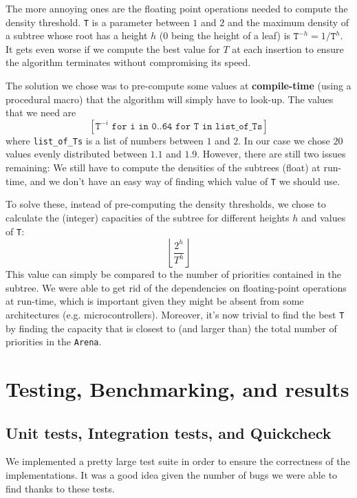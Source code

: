 \documentclass[12pt]{article}
\begin{document}
The more annoying ones are the floating point operations needed to compute the density threshold.
\texttt{T} is a parameter between $1$ and $2$ and the maximum density of a subtree whose root has a height $h$ ($0$ being the height of a leaf) is $\texttt{T}^{-h} = 1 / \texttt{T}^h$.
It gets even worse if we compute the best value for $T$ at each insertion to ensure the algorithm terminates without compromising its speed.

The solution we chose was to pre-compute some values at \textbf{compile-time} (using a procedural macro) that the algorithm will simply have to look-up.
The values that we need are
$$[\texttt{T}^{-i} \texttt{  for i in 0..64  for T in list\_of\_Ts}]$$
where \texttt{list\_of\_Ts} is a list of numbers between $1$ and $2$. In our case we chose $20$ values evenly distributed between $1.1$ and $1.9$.
However, there are still two issues remaining: We still have to compute the densities of the subtrees (float) at run-time, and we don't have an easy way of finding which value of \texttt{T} we should use.

To solve these, instead of pre-computing the density thresholds, we chose to calculate the (integer) capacities of the subtree for different heights $h$ and values of \texttt{T}:
$$ \left\lfloor \frac{2^h}{T^h} \right\rfloor $$
This value can simply be compared to the number of priorities contained in the subtree.
We were able to get rid of the dependencies on floating-point operations at run-time, which is important given they might be absent from some architectures (e.g. microcontrollers).
Moreover, it's now trivial to find the best \texttt{T} by finding the capacity that is closest to (and larger than) the total number of priorities in the \texttt{Arena}.


\newpage
\section{Testing, Benchmarking, and results}

\subsection{Unit tests, Integration tests, and Quickcheck}

We implemented a pretty large test suite in order to ensure the correctness of the implementations. It was a good idea given the number of bugs we were able to find thanks to these tests.
\end{document}
